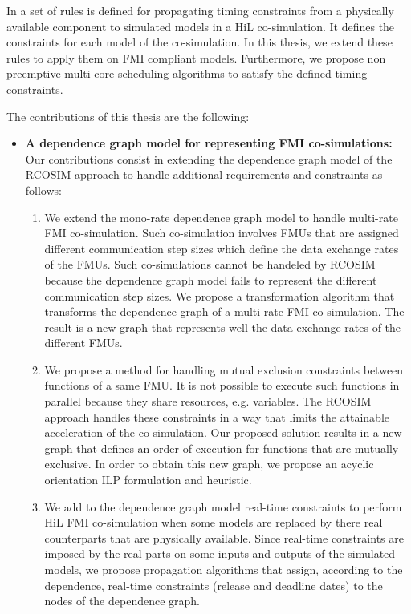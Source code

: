 In \cite{faure:2011} a set of rules is defined for propagating timing constraints from a physically available component to simulated models in a HiL co-simulation. It defines the constraints for each model of the co-simulation. In this thesis, we extend these rules to apply them on FMI compliant models. Furthermore, we propose non preemptive multi-core scheduling algorithms to satisfy the defined timing constraints.

The contributions of this thesis are the following:

\begin{itemize}

\item \textbf{A dependence graph model for representing FMI co-simulations:} Our contributions consist in extending the dependence graph model of the RCOSIM approach to handle additional requirements and constraints as follows:

\begin{enumerate}

\item We extend the mono-rate dependence graph model to handle multi-rate FMI co-simulation. Such co-simulation involves FMUs that are assigned different communication step
sizes which define the data exchange rates of the FMUs. Such co-simulations cannot be handeled by RCOSIM because the dependence graph model fails to represent the different communication step sizes. We propose a transformation algorithm that transforms the dependence graph of a multi-rate FMI co-simulation. The result is a new graph that represents well the data exchange rates of the different FMUs.

\item We propose a method for handling mutual exclusion constraints between functions of a same FMU.  It is not possible to execute such functions in parallel because they share resources, e.g. variables. The RCOSIM approach handles these constraints in a way that limits the attainable acceleration of the co-simulation. Our proposed solution results in a new graph that defines an order of execution for functions that are mutually exclusive. In order to obtain this new graph, we propose an acyclic orientation ILP formulation and heuristic.

\item We add to the dependence graph model real-time constraints to perform HiL FMI co-simulation when some models are replaced by there real counterparts that are physically available. Since real-time constraints are  imposed by the real parts on some inputs and outputs of the simulated models, we propose propagation algorithms that assign, according to the dependence, real-time constraints (release and deadline dates) to the nodes of the dependence graph. 


\end{enumerate}
\end{itemize}

